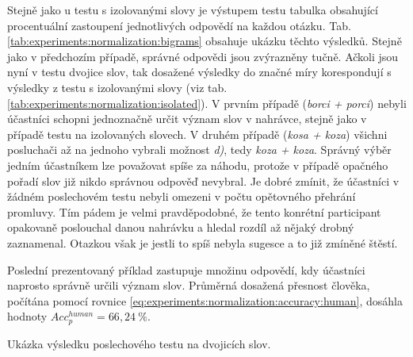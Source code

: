 Stejně jako u testu s izolovanými slovy je výstupem testu tabulka obsahující procentuální zastoupení jednotlivých odpovědí na každou otázku. Tab. \ref{tab:experiments:normalization:bigrams} obsahuje ukázku těchto výsledků. Stejně jako v předchozím případě, správné odpovědi jsou zvýrazněny tučně. Ačkoli jsou nyní v testu dvojice slov, tak dosažené výsledky do značné míry korespondují s výsledky z testu s izolovanými slovy (viz tab. \ref{tab:experiments:normalization:isolated}). V prvním případě (\textit{borci + porci}) nebyli účastníci schopni jednoznačně určit význam slov v nahrávce, stejně jako v případě testu na izolovaných slovech. V druhém případě (\textit{kosa + koza}) všichni posluchači až na jednoho vybrali možnost \textit{d)}, tedy \textit{koza + koza}. Správný výběr jedním účastníkem lze považovat spíše za náhodu, protože v případě opačného pořadí slov již nikdo správnou odpověď nevybral. Je dobré zmínit, že účastníci v žádném poslechovém testu nebyli omezeni v počtu opětovného přehrání promluvy. Tím pádem je velmi pravděpodobné, že tento konrétní participant opakovaně poslouchal danou nahrávku a hledal rozdíl až nějaký drobný zaznamenal. Otazkou však je jestli to spíš nebyla sugesce a to již zmíněné štěstí.

Poslední prezentovaný příklad zastupuje množinu odpovědí, kdy účastníci naprosto správně určili význam slov. Průměrná dosažená přesnost člověka, počítána pomocí rovnice \ref{eq:experiments:normalization:accuracy:human}, dosáhla hodnoty $Acc_{p}^{human} = 66,24\ \%$.

\begin{table}[htpb]
  \centering
  \def\arraystretch{1.5}
  \caption{Ukázka výsledku poslechového testu na dvojicích slov.}
  \label{tab:experiments:normalization:bigrams}
\end{table}

